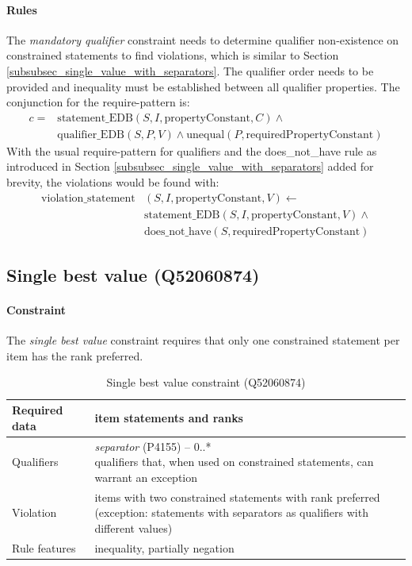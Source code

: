 \documentclass[hyperref,bachelorofscience,fleqn]{cgvpub}
\begin{document}
\paragraph{Rules}
The \emph{mandatory qualifier} constraint needs to determine qualifier non-existence on constrained statements to find violations, which is similar to Section \ref{subsubsec_single_value_with_separators}. The qualifier order needs to be provided and inequality must be established between all qualifier properties. The conjunction for the require-pattern is:
\begin{equation*}
\begin{split}
c = &\text{statement\_EDB}(S, I, \text{propertyConstant}, C) \wedge{} \\
&\text{qualifier\_EDB}(S, P, V) \wedge \text{unequal}(P, \text{requiredPropertyConstant})
\end{split}
\end{equation*}
With the usual require-pattern for qualifiers and the does\_not\_have rule as introduced in Section \ref{subsubsec_single_value_with_separators} added for brevity, the violations would be found with:
\begin{equation*}
\begin{split}
\text{violation\_statement}&(S, I, \text{propertyConstant}, V) \leftarrow \\
&\text{statement\_EDB}(S, I, \text{propertyConstant}, V) \wedge \\
&\text{does\_not\_have}(S, \text{requiredPropertyConstant})
\end{split}
\end{equation*}

\subsection{Single best value (Q52060874)}\label{subsec_single_best_value}
\paragraph{Constraint}
The \emph{single best value} constraint requires that only one constrained statement per item has the rank preferred.

\begin{table}[H]
\caption{Single best value constraint (Q52060874)}
\begin{tabularx}{\textwidth}{ ll X}
\hline
Required data & item statements and ranks \\
\hline
Qualifiers & \makecell{\emph{separator} (P4155) -- 0..* \\ qualifiers that, when used on constrained statements, can warrant an exception } \\
\hline
Violation & \makecell{items with two constrained statements with rank preferred \\ (exception: statements with separators as qualifiers with different values)} \\
\hline
Rule features & inequality, partially negation \\
\hline
\end{tabularx}
\end{table}
\end{document}
